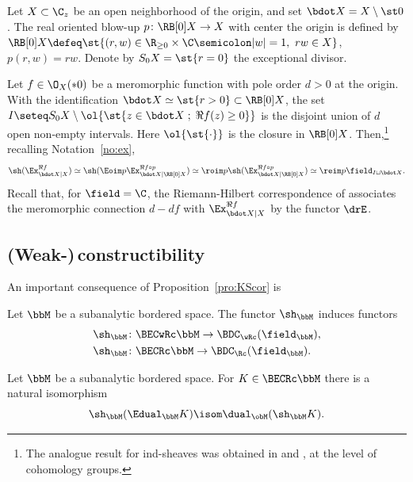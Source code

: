 \begin{example}
Let $X\subset \C_z$ be an open neighborhood of the origin, and set $\bdot X=X\setminus\st0$.
The real oriented blow-up $p\colon \RB[0]X \to X$ with center the origin is
defined by $\RB[0]X \defeq\st{(r,w)\in\R_{\ge0}\times\C\semicolon |w|=1,\ rw\in X}$,
$p(r,w)=r w$. Denote by $S_0X=\st{r=0}$ the exceptional divisor.

Let $f\in\O_X(*0)$ be a meromorphic function with pole order $d>0$
at the origin.
With the identification $\bdot X\simeq\st{r>0}\subset\RB[0]X$, the set
$I\seteq S_0X\setminus\ol{\st{z\in\bdot X\;;\;\Re f(z)\ge0}}$
is the disjoint union of $d$ open non-empty intervals.
Here
$\ol{\st{\cdot}}$ is the closure in $\RB[0]X$.
Then,\footnote{The analogue result for ind-sheaves was obtained in \cite[Prop.\,7.3]{KS03} and \cite[Prop.\,3.14]{IT20}, at the level of cohomology groups.} recalling Notation~\ref{no:ex},
\[
\sh(\Ex_{\bdot X|X}^{\Re f}) \simeq
\sh (\Eoim p \Ex_{\bdot X|\RB[0]X}^{\Re f\circ p})
\simeq \roim p\sh ( \Ex_{\bdot X|\RB[0]X}^{\Re f\circ p})\simeq
\reim p \field_{I\sqcup\bdot X}.
\]
Recall that, for $\field=\C$, the Riemann-Hilbert correspondence of \cite{DK16} associates the meromorphic connection $d-df$ with $\Ex_{\bdot X|X}^{\Re f}$ by the functor $\drE$.
\end{example}

\subsection{(Weak-)\,constructibility}

An important consequence of Proposition~\ref{pro:KScor} is

\begin{proposition}[{\cite[Th.\,6.6.4]{KS16}}]
Let $\bbM$ be a subanalytic bordered space.
The functor $\sh_\bbM$ induces functors
\begin{align*}
\sh_\bbM&\colon\BECwRc \bbM \to \BDC_\wRc(\field_\bbM), \\
\sh_\bbM&\colon\BECRc \bbM \to \BDC_\Rc(\field_\bbM).
\end{align*}
\end{proposition}

\begin{proposition}
Let $\bbM$ be a subanalytic bordered space.
For $K\in\BECRc \bbM$ there is a natural isomorphism
\[
\sh_\bbM( \Edual_\bbM K) \isom \dual_\obM( \sh_\bbM K).
\]
\end{proposition}

